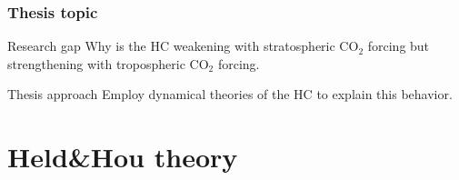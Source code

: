 \documentclass{beamer}
\begin{document}
\begin{frame}
    \frametitle{Thesis topic}
    \begin{alertblock}{Research gap}
        Why is the HC weakening with stratospheric CO$_2$ forcing but strengthening with tropospheric CO$_2$ forcing.
    \end{alertblock}
    \begin{block}{Thesis approach}
        Employ dynamical theories of the HC to explain this behavior.
    \end{block}
\end{frame}


\section{Held\&Hou theory}

\end{document}
